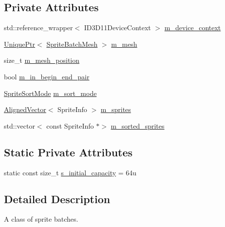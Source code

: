 \subsection*{Private Attributes}
\begin{DoxyCompactItemize}
\item 
std\+::reference\+\_\+wrapper$<$ I\+D3\+D11\+Device\+Context $>$ \hyperlink{classmage_1_1rendering_1_1_sprite_batch_1_1_impl_a4072773cc783a776fdfa5cb069403ce4}{m\+\_\+device\+\_\+context}
\item 
\hyperlink{namespacemage_a3316d7143a973e37adf1110f2e80ca31}{Unique\+Ptr}$<$ \hyperlink{classmage_1_1rendering_1_1_sprite_batch_mesh}{Sprite\+Batch\+Mesh} $>$ \hyperlink{classmage_1_1rendering_1_1_sprite_batch_1_1_impl_a6ea37418810939906de6614c6233b4be}{m\+\_\+mesh}
\item 
size\+\_\+t \hyperlink{classmage_1_1rendering_1_1_sprite_batch_1_1_impl_ab8e03aab794373cafdba47da389044a0}{m\+\_\+mesh\+\_\+position}
\item 
bool \hyperlink{classmage_1_1rendering_1_1_sprite_batch_1_1_impl_ad498fe3044bbf1c303119ad4d8edcf7b}{m\+\_\+in\+\_\+begin\+\_\+end\+\_\+pair}
\item 
\hyperlink{namespacemage_1_1rendering_a4fad00dbca0c8d854c765ab831c76055}{Sprite\+Sort\+Mode} \hyperlink{classmage_1_1rendering_1_1_sprite_batch_1_1_impl_a98659f29ee7ea1bdcc8c18ac0dfdcf48}{m\+\_\+sort\+\_\+mode}
\item 
\hyperlink{namespacemage_a8664bfb5ce2179fc64eae9f82c8a5ba8}{Aligned\+Vector}$<$ Sprite\+Info $>$ \hyperlink{classmage_1_1rendering_1_1_sprite_batch_1_1_impl_ad8f211053433418cf5fa6c64402936b3}{m\+\_\+sprites}
\item 
std\+::vector$<$ const Sprite\+Info $\ast$$>$ \hyperlink{classmage_1_1rendering_1_1_sprite_batch_1_1_impl_a1209d58b70713e61bc8f8fc753f9036e}{m\+\_\+sorted\+\_\+sprites}
\end{DoxyCompactItemize}
\subsection*{Static Private Attributes}
\begin{DoxyCompactItemize}
\item 
static const size\+\_\+t \hyperlink{classmage_1_1rendering_1_1_sprite_batch_1_1_impl_a08c5c67bb9af1c630745aba436718ff5}{s\+\_\+initial\+\_\+capacity} = 64u
\end{DoxyCompactItemize}


\subsection{Detailed Description}
A class of sprite batches. 

